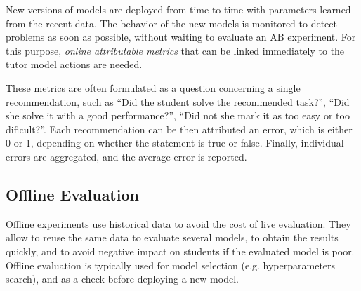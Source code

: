 
New versions of models are deployed from time to time
  with parameters learned from the recent data.
The behavior of the new models is monitored
  to detect problems as soon as possible,
  without waiting to evaluate an AB experiment.
For this purpose, \emph{online attributable metrics} that can be linked
  immediately to the tutor model actions are needed.

These metrics are often formulated as a question concerning a single recommendation,
such as
``Did the student solve the recommended task?'',
``Did she solve it with a good performance?'',
``Did not she mark it as too easy or too dificult?''.
Each recommendation can be then attributed an error, which is either 0 or 1, depending
on whether the statement is true or false.
Finally, individual errors are aggregated, and the average error is reported.





\subsection{Offline Evaluation}

Offline experiments use historical data to avoid the cost of live evaluation.
They allow to reuse the same data to evaluate several models,
  to obtain the results quickly,
  and to avoid negative impact on students if the evaluated model is poor.
Offline evaluation is typically used
for model selection (e.g. hyperparameters search),
and as a check before deploying a new model. %

